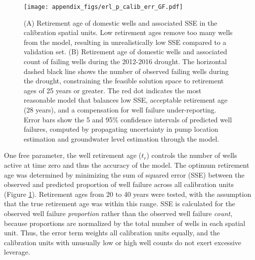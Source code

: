 \begin{figure}[ht]
	\texttt{[image: appendix\_figs/erl\_p\_calib\_err\_GF.pdf]}
	\caption{(A) Retirement age of domestic wells and associated SSE in the calibration spatial units. Low retirement ages remove too many wells from the model, resulting in unrealistically low SSE compared to a validation set. (B) Retirement age of domestic wells and associated count of failing wells during the 2012-2016 drought. The horizontal dashed black line shows the number of observed failing wells during the drought, constraining the feasible solution space to retirement ages of 25 years or greater. The red dot indicates the most reasonable model that balances low SSE, acceptable retirement age (28 years), and a compensation for well failure under-reporting. Error bars show the 5 and 95\% confidence intervals of predicted well failures, computed by propagating uncertainty in pump location estimation and groundwater level estimation through the model.}
	\label{fig:calib_err}
\end{figure}

One free parameter, the well retirement age ($t_r$) controls the number of wells active at time zero and thus the accuracy of the model. The optimum retirement age was determined by minimizing the sum of squared error (SSE) between the observed and predicted proportion of well failure across all calibration units (Figure \ref{fig:calib_err}). Retirement ages from 20 to 40 years were tested, with the assumption that the true retirement age was within this range. SSE is calculated for the observed well failure \textit{proportion} rather than the observed well failure \textit{count}, because proportions are normalized by the total number of wells in each spatial unit. Thus, the error term weights all calibration units equally, and the calibration units with unusually low or high well counts do not exert excessive leverage.  



